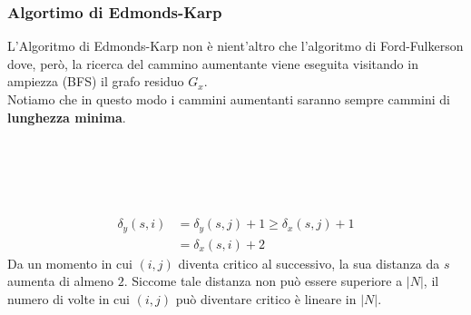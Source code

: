\documentclass[a4paper,12pt]{article}
\begin{document}
\subsubsection{Algortimo di Edmonds-Karp}
L’Algoritmo di Edmonds-Karp non è nient’altro che l’algoritmo di
Ford-Fulkerson dove, però, la ricerca del cammino aumentante
viene eseguita visitando in ampiezza (BFS) il grafo residuo $G_x$.\\
Notiamo che in questo modo i cammini aumentanti saranno
sempre cammini di \textbf{lunghezza minima}.\\
\vspace{1px}\\
\\
\vspace{1px}\\
\\
\vspace{1px}\\
\begin{align*}
  \delta_y (s,i) & = \delta_y (s,j)+1 \geq \delta_x (s,j)+1 \\
  & = \delta_x (s,i)+2
\end{align*}
Da un momento in cui $(i, j)$ diventa critico al successivo, la sua
distanza da $s$ aumenta di almeno $2$. Siccome tale distanza non può essere
superiore a $|N|$, il numero di volte in cui $(i, j)$ può diventare critico è lineare in $|N|$.\\
\end{document}
